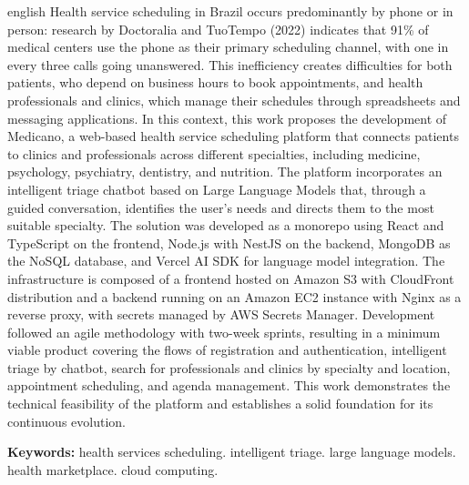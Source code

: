 \begin{resumo}[Abstract]
  \begin{otherlanguage*}{english}
    Health service scheduling in Brazil occurs predominantly
    by phone or in person: research by Doctoralia and TuoTempo
    (2022) indicates that 91\% of medical centers use the phone
    as their primary scheduling channel, with one in every three
    calls going unanswered. This inefficiency creates difficulties
    for both patients, who depend on business hours to book
    appointments, and health professionals and clinics, which
    manage their schedules through spreadsheets and messaging
    applications. In this context, this work proposes the
    development of Medicano, a web-based health service
    scheduling platform that connects patients to clinics and
    professionals across different specialties, including
    medicine, psychology, psychiatry, dentistry, and nutrition.
    The platform incorporates an intelligent triage chatbot
    based on Large Language Models that, through a guided
    conversation, identifies the user's needs and directs them
    to the most suitable specialty. The solution was developed
    as a monorepo using React and TypeScript on the frontend,
    Node.js with NestJS on the backend, MongoDB as the NoSQL
    database, and Vercel AI SDK for language model integration.
    The infrastructure is composed of a frontend hosted on
    Amazon S3 with CloudFront distribution and a backend
    running on an Amazon EC2 instance with Nginx as a reverse
    proxy, with secrets managed by AWS Secrets Manager.
    Development followed an agile methodology with two-week
    sprints, resulting in a minimum viable product covering
    the flows of registration and authentication, intelligent
    triage by chatbot, search for professionals and clinics
    by specialty and location, appointment scheduling, and
    agenda management. This work demonstrates the technical
    feasibility of the platform and establishes a solid
    foundation for its continuous evolution.

    \vspace{\onelineskip}
    \noindent\textbf{Keywords:}
    health services scheduling. intelligent triage.
    large language models. health marketplace.
    cloud computing.
  \end{otherlanguage*}
\end{resumo}